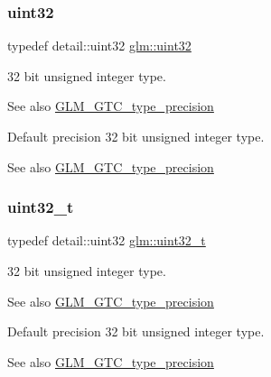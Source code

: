 \subsubsection{\texorpdfstring{uint32}{uint32}}
{\footnotesize\ttfamily typedef detail\+::uint32 \hyperlink{group__gtc__type__precision_ga202b6a53c105fcb7e531f9b443518451}{glm\+::uint32}}

32 bit unsigned integer type. \begin{DoxySeeAlso}{See also}
\hyperlink{group__gtc__type__precision}{G\+L\+M\+\_\+\+G\+T\+C\+\_\+type\+\_\+precision}
\end{DoxySeeAlso}
Default precision 32 bit unsigned integer type. \begin{DoxySeeAlso}{See also}
\hyperlink{group__gtc__type__precision}{G\+L\+M\+\_\+\+G\+T\+C\+\_\+type\+\_\+precision} 
\end{DoxySeeAlso}
\mbox{\label{group__gtc__type__precision_ga822ca53a9ad412504532838906276a99}} 
\subsubsection{\texorpdfstring{uint32\+\_\+t}{uint32\_t}}
{\footnotesize\ttfamily typedef detail\+::uint32 \hyperlink{group__gtc__type__precision_ga822ca53a9ad412504532838906276a99}{glm\+::uint32\+\_\+t}}

32 bit unsigned integer type. \begin{DoxySeeAlso}{See also}
\hyperlink{group__gtc__type__precision}{G\+L\+M\+\_\+\+G\+T\+C\+\_\+type\+\_\+precision}
\end{DoxySeeAlso}
Default precision 32 bit unsigned integer type. \begin{DoxySeeAlso}{See also}
\hyperlink{group__gtc__type__precision}{G\+L\+M\+\_\+\+G\+T\+C\+\_\+type\+\_\+precision} 
\end{DoxySeeAlso}
\mbox{\label{group__gtc__type__precision_gae3632bf9b37da66233d78930dd06378a}} 
